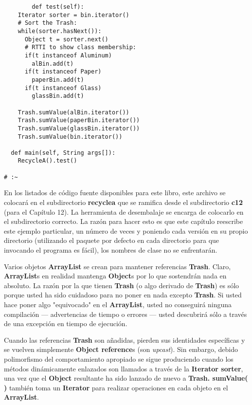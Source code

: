 \begin{lstlisting}
        def test(self): 
    Iterator sorter = bin.iterator() 
    # Sort the Trash: 
    while(sorter.hasNext()): 
      Object t = sorter.next() 
      # RTTI to show class membership: 
      if(t instanceof Aluminum) 
        alBin.add(t) 
      if(t instanceof Paper) 
        paperBin.add(t) 
      if(t instanceof Glass) 
        glassBin.add(t)   
        
    Trash.sumValue(alBin.iterator()) 
    Trash.sumValue(paperBin.iterator()) 
    Trash.sumValue(glassBin.iterator()) 
    Trash.sumValue(bin.iterator()) 
    
  def main(self, String args[]): 
    RecycleA().test() 
    
# :~ 
\end{lstlisting}

En los listados de código fuente disponibles para este libro, este archivo se colocará en el subdirectorio \textbf{recyclea} que se ramifica desde el subdirectorio \textbf{c12} (para el Capítulo 12). La herramienta de desembalaje se encarga de colocarlo en el subdirectorio correcto. La razón para hacer esto es que este capítulo reescribe este ejemplo particular, un número de veces y poniendo cada versión en su propio directorio (utilizando el paquete por defecto en cada directorio para que invocando el programa es fácil), los nombres de clase no se enfrentarán.     \newline

Varios objetos \textbf{ArrayList} se crean para mantener referencias \textbf{Trash}. Claro, \textbf{ArrayList}s en realidad mantenga \textbf{Object}s por lo que sostendrán nada en absoluto. La razón por la que tienen \textbf{Trash} (o algo derivado de \textbf{Trash}) es sólo porque usted ha sido cuidadoso para no poner en nada excepto \textbf{Trash}. Si usted hace poner algo "equivocado" en el \textbf{ArrayList}, usted no conseguirá ninguna compilación — advertencias de tiempo o errores — usted descubrirá sólo a través de una excepción en tiempo de ejecución.   \newline

Cuando las referencias \textbf{Trash} son añadidas, pierden sus identidades específicas y se vuelven simplemente \textbf{Object reference}s (son \textit{upcast}). Sin embargo, debido polimorfismo del comportamiento apropiado se sigue produciendo cuando los métodos dinámicamente enlazados son llamados a través de la \textbf{Iterator sorter}, una vez que el \textbf{Object} resultante ha sido lanzado de nuevo a \textbf{Trash. sumValue( )} también toma un \textbf{Iterator} para realizar operaciones en cada objeto en el \textbf{ArrayList}.   \newline

